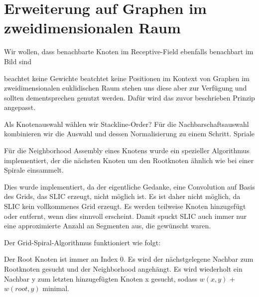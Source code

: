 \section{Erweiterung auf Graphen im zweidimensionalen Raum}
\label{raeumliche_erweiterung}

Wir wollen, dass benachbarte Knoten im Receptive-Field ebenfalls benachbart im Bild sind

beachtet keine Gewichte
beatchtet keine Positionen
im Kontext von Graphen im zweidimensionalen  euklidischen  Raum stehen uns diese aber zur Verfügung und sollten dementsprechen genutzt werden.
Dafür wird das zuvor beschrieben Prinzip angepasst.

Als Knotenauswahl wählen wir Stackline-Order?
Für die Nachbarschaftsauswahl kombinieren wir die Auswahl und dessen Normalisierung zu einem Schritt.
Spriale

Für die Neighborhood Assembly eines Knotens wurde ein spezieller Algorithmus implementiert, der die nächsten Knoten um den Rootknoten ähnlich wie bei einer Spirale einsammelt.

Dies wurde implementiert, da der eigentliche Gedanke, eine Convolution auf Basis des Grids, das SLIC erzeugt, nicht möglich ist. Es ist daher nicht möglich, da SLIC kein vollkommenes Grid erzeugt. Es werden teilweise Knoten hinzugefügt oder entfernt, wenn dies sinnvoll erscheint. Damit spuckt SLIC auch immer nur eine approximierte Anzahl an Segmenten aus, die gewünscht waren.

Der Grid-Spiral-Algorithmus funktioniert wie folgt:

Der Root Knoten ist immer an Index 0.
Es wird der nächstgelegene Nachbar zum Rootknoten gesucht und der Neighborhood angehängt.
Es wird wiederholt ein Nachbar y zum letzten hinzugefügten Knoten x gesucht, sodass $w(x, y)$ + $w(root, y)$ minimal.

\begin{algorithm}[t]
\centering
\begin{algorithmic}
  \REQUIRE{}
  \ENSURE{}
\end{algorithmic}
\caption[]{}
\label{alg:spirale}
\end{algorithm}
